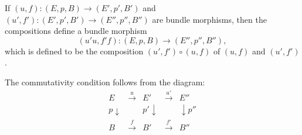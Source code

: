 If $(u, f): (E, p, B) \rightarrow (E', p', B')$ and $(u', f'): (E', p', B') \rightarrow (E'', p'', B'')$ are bundle morphisms, then the compositions define a bundle morphism
\[
(u'u, f'f): (E, p, B) \rightarrow (E'', p'', B''),
\]
which is defined to be the composition $(u', f') \circ (u, f)$ of $(u, f)$ and $(u', f')$.

The commutativity condition follows from the diagram:
\[
\begin{array}{ccccc}
E & \xrightarrow{u} & E' & \xrightarrow{u'} & E'' \\
p\downarrow & & p'\downarrow & & \downarrow p'' \\
B & \xrightarrow{f} & B' & \xrightarrow{f'} & B''
\end{array}
\]
